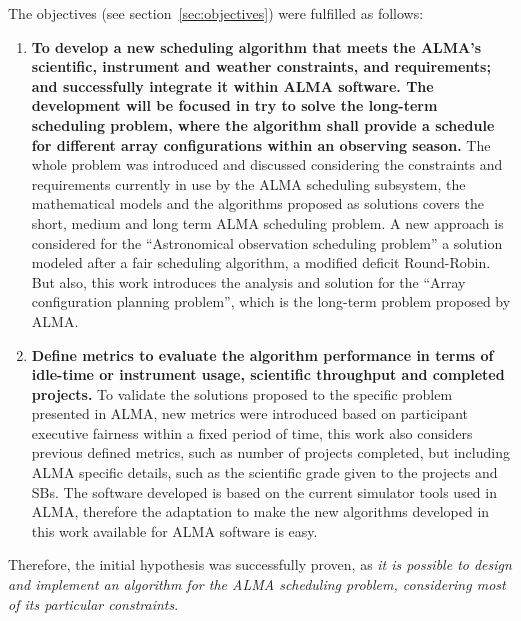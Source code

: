 The objectives (see section~\ref{sec:objectives}) were fulfilled as follows:
\begin{enumerate}
\item \textbf{To develop a new scheduling algorithm that meets the ALMA’s scientific, instrument and
weather constraints, and requirements; and successfully integrate it within ALMA software.
The development will be focused in try to solve the long-term scheduling problem, where
the algorithm shall provide a schedule for different array configurations within an
observing season.} The whole problem was introduced and discussed considering the constraints and requirements currently in use by the ALMA scheduling subsystem, the mathematical models and the algorithms proposed as solutions covers the short, medium and long term ALMA scheduling problem. A new approach is considered for the ``Astronomical observation scheduling problem'' a solution modeled after a fair scheduling algorithm, a modified deficit Round-Robin. But also, this work introduces the analysis and solution for the ``Array configuration planning problem'', which is the long-term problem proposed by ALMA.
\item \textbf{Define metrics to evaluate the algorithm performance in terms of idle-time or instrument
usage, scientific throughput and completed projects.} To validate the solutions proposed to the specific problem presented in ALMA, new metrics were introduced based on participant executive fairness within a fixed period of time, this work also considers previous defined metrics, such as number of projects completed, but including ALMA specific details, such as the scientific grade given to the projects and SBs. The software developed is based on the current simulator tools used in ALMA, therefore the adaptation to make the new algorithms developed in this work available for ALMA software is easy. 
\end{enumerate}

Therefore, the initial hypothesis was successfully proven, as \textit{it is possible to design and implement an algorithm for the ALMA scheduling problem, considering most of its particular constraints}.

